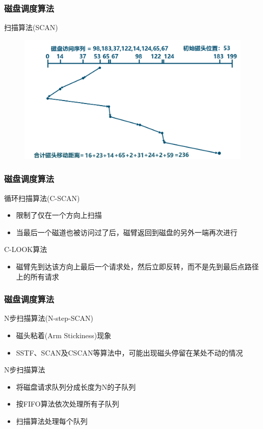 \begin{frame}[fragile]
    \frametitle{磁盘调度算法}
    扫描算法(SCAN)
%        
\begin{figure}
    \includegraphics[width=0.7\linewidth]{figs/disk-scan.png}
\end{figure}
\end{frame}
\begin{frame}[fragile]
    \frametitle{磁盘调度算法}
    循环扫描算法(C-SCAN)
    \begin{itemize}
        \item 限制了仅在一个方向上扫描
        \item 当最后一个磁道也被访问过了后，磁臂返回到磁盘的另外一端再次进行
   \end{itemize}
    C-LOOK算法
   \begin{itemize}
       \item 磁臂先到达该方向上最后一个请求处，然后立即反转，而不是先到最后点路径上的所有请求

    \end{itemize}
\end{frame}
\begin{frame}[fragile]
    \frametitle{磁盘调度算法}
    N步扫描算法(N-step-SCAN)
    \begin{itemize}
        \item 磁头粘着(Arm Stickiness)现象
        \item SSTF、SCAN及CSCAN等算法中，可能出现磁头停留在某处不动的情况
    \end{itemize}
    N步扫描算法
    \begin{itemize}
        \item 将磁盘请求队列分成长度为N的子队列
        \item 按FIFO算法依次处理所有子队列
        \item 扫描算法处理每个队列        
    \end{itemize}
\end{frame}

